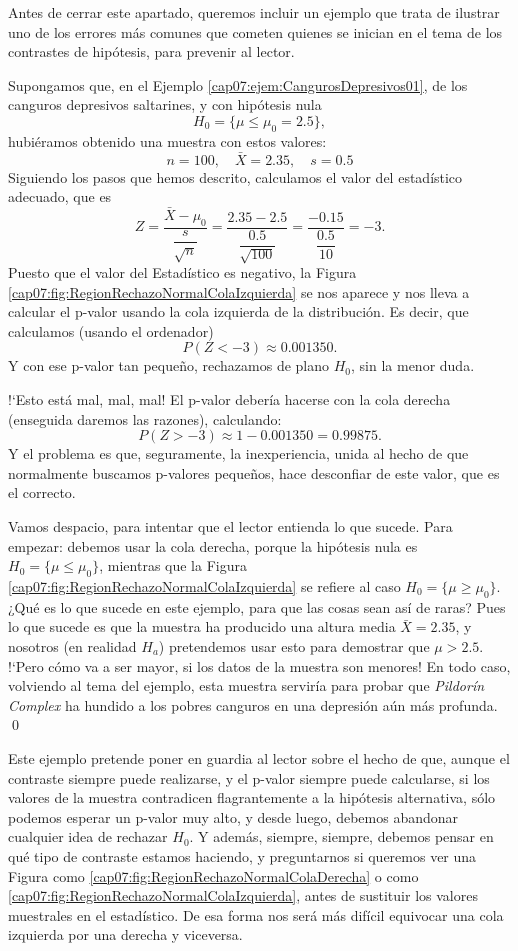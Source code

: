 Antes de cerrar este apartado, queremos incluir un ejemplo que trata de ilustrar uno de los errores más comunes que cometen quienes se inician en el tema de los contrastes de hipótesis, para prevenir al lector.
\begin{ejemplo}\label{cap07:ejem:ErrorTipicoContrastesHipotesis}
Supongamos que, en el Ejemplo \ref{cap07:ejem:CangurosDepresivos01}, de los canguros depresivos saltarines, y con hipótesis nula
    \[H_0=\{\mu\leq \mu_0=2.5\},\]
hubiéramos obtenido una muestra con estos valores:
    \[n=100,\quad \bar X=2.35,\quad s=0.5\]
Siguiendo los pasos que hemos descrito, calculamos el valor del estadístico adecuado, que es
    \[
    Z=\dfrac{\bar X-\mu_0}{\dfrac{s}{\sqrt{n}}}=\dfrac{2.35-2.5}{\dfrac{0.5}{\sqrt{100}}}=
    \dfrac{-0.15}{\dfrac{0.5}{10}}=-3.
    \]
Puesto que el valor del Estadístico es negativo, la Figura \ref{cap07:fig:RegionRechazoNormalColaIzquierda} se nos aparece y nos lleva a calcular el p-valor usando la cola izquierda de la distribución.  Es decir, que calculamos (usando el ordenador)
\[P\left(Z < -3\right)\approx 0.001350.\]
Y con ese p-valor tan pequeño, rechazamos de plano $H_0$, sin la menor duda.

{!`}Esto está mal, mal, mal! El p-valor debería hacerse con la cola derecha (enseguida daremos las razones), calculando:
\[P\left(Z > -3\right)\approx 1-0.001350=0.99875.\]
Y el problema es que, seguramente, la inexperiencia, unida al hecho de que normalmente buscamos p-valores pequeños, hace desconfiar de este valor, que es el correcto.

Vamos despacio, para intentar que el lector entienda lo que sucede. Para empezar: debemos usar la cola derecha, porque la hipótesis nula es $H_0=\{\mu\leq \mu_0\}$, mientras que la Figura \ref{cap07:fig:RegionRechazoNormalColaIzquierda} se refiere al caso $H_0=\{\mu\geq \mu_0\}$. ¿Qué es lo que sucede en este ejemplo, para que las cosas sean así de raras? Pues lo que sucede es que la muestra ha producido una altura media $\bar X=2.35$, y nosotros (en realidad $H_a$) pretendemos usar esto para demostrar que $\mu > 2.5$. {!`}Pero cómo va a ser mayor, si los datos de la muestra son menores! En todo caso, volviendo al tema del ejemplo, esta muestra serviría para probar que {\em Pildorín Complex} ha hundido a los pobres canguros en una depresión aún más profunda.
\qed
\end{ejemplo}
Este ejemplo pretende poner en guardia al lector sobre el hecho de que, aunque el contraste siempre puede realizarse, y el p-valor siempre puede calcularse, si los valores de la muestra contradicen flagrantemente a la hipótesis alternativa, sólo podemos esperar un p-valor muy alto, y desde luego, debemos abandonar cualquier idea de rechazar $H_0$. Y además, siempre, siempre, debemos pensar en qué tipo de contraste estamos haciendo, y preguntarnos si queremos ver una Figura como \ref{cap07:fig:RegionRechazoNormalColaDerecha} o como \ref{cap07:fig:RegionRechazoNormalColaIzquierda}, antes de sustituir los valores muestrales en el estadístico. De esa forma nos será más difícil equivocar una cola izquierda por una derecha y viceversa.


